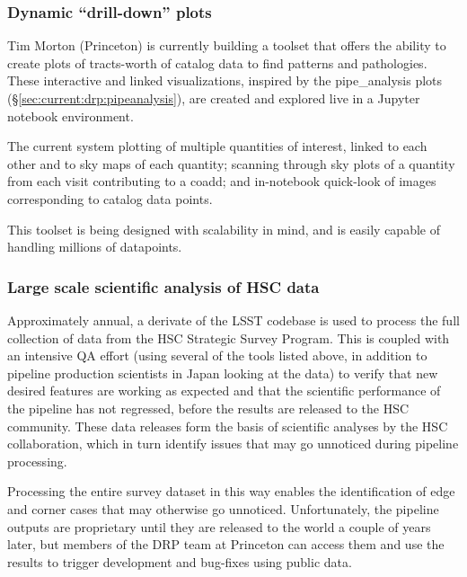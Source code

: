 \documentclass[DM,authoryear,toc,lsstdraft]{lsstdoc}
\begin{document}
\subsubsection{Dynamic ``drill-down'' plots}
\label{sec:current:drp:drilldown}

Tim Morton (Princeton) is currently building a toolset that offers the ability
to create plots of tracts-worth of catalog data to find patterns and
pathologies. These interactive and linked visualizations, inspired by the
pipe\_analysis plots (\S\ref{sec:current:drp:pipeanalysis}), are created and
explored live in a Jupyter notebook environment.

The current system plotting of multiple quantities of interest, linked to each
other and to sky maps of each quantity; scanning through sky plots of a
quantity from each visit contributing to a coadd; and in-notebook quick-look
of images corresponding to catalog data points.

This toolset is being designed with scalability in mind, and is easily capable
of handling millions of datapoints.

\subsubsection{Large scale scientific analysis of HSC data}
\label{sec:current:drp:hsc}

Approximately annual, a derivate of the LSST codebase is used to process the
full collection of data from the HSC Strategic Survey Program.  This is
coupled with an intensive QA effort (using several of the tools listed above,
in addition to pipeline production scientists in Japan looking at the data) to
verify that new desired features are working as expected and that the
scientific performance of the pipeline has not regressed, before the results
are released to the HSC community. These data releases form the basis of
scientific analyses by the HSC collaboration, which in turn identify issues
that may go unnoticed during pipeline processing.

Processing the entire survey dataset in this way enables the identification of
edge and corner cases that may otherwise go unnoticed.  Unfortunately, the
pipeline outputs are proprietary until they are released to the world a couple
of years later, but members of the DRP team at Princeton can access them and
use the results to trigger development and bug-fixes using public data.
\end{document}
